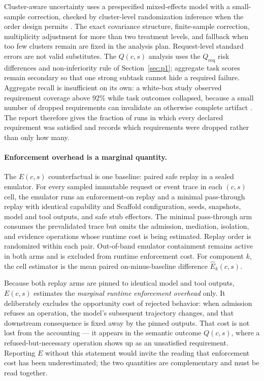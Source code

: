 Cluster-aware uncertainty uses a prespecified mixed-effects model with a small-sample correction, checked by cluster-level randomization inference when the order design permits \cite{turner2007cluster}. The exact covariance structure, finite-sample correction, multiplicity adjustment for more than two treatment levels, and fallback when too few clusters remain are fixed in the analysis plan. Request-level standard errors are not valid substitutes. The $Q(c,s)$ analysis uses the $Q_{\mathrm{req}}$ risk differences and non-inferiority rule of Section~\ref{sec:p1}; aggregate task scores remain secondary so that one strong subtask cannot hide a required failure. Aggregate recall is insufficient on its own: a white-box study observed requirement coverage above 92\% while task outcomes collapsed, because a small number of dropped requirements can invalidate an otherwise complete artifact \cite{xue2026longcontext}. The report therefore gives the fraction of runs in which every declared requirement was satisfied and records which requirements were dropped rather than only how many.

\paragraph{Enforcement overhead is a marginal quantity.}
The $E(c,s)$ counterfactual is one baseline: paired safe replay in a sealed emulator. For every sampled immutable request or event trace in each $(c,s)$ cell, the emulator runs an enforcement-on replay and a minimal pass-through replay with identical capability and Scaffold configuration, seeds, snapshots, model and tool outputs, and safe stub effectors. The minimal pass-through arm consumes the prevalidated trace but omits the admission, mediation, isolation, and evidence operations whose runtime cost is being estimated. Replay order is randomized within each pair. Out-of-band emulator containment remains active in both arms and is excluded from runtime enforcement cost. For component $k$, the cell estimator is the mean paired on-minus-baseline difference $\widehat{E}_k(c,s)$.

Because both replay arms are pinned to identical model and tool outputs, $E(c,s)$ estimates the \textit{marginal runtime enforcement overhead} only. It deliberately excludes the opportunity cost of rejected behavior: when admission refuses an operation, the model's subsequent trajectory changes, and that downstream consequence is fixed away by the pinned outputs. That cost is not lost from the accounting --- it appears in the semantic outcome $Q(c,s)$, where a refused-but-necessary operation shows up as an unsatisfied requirement. Reporting $E$ without this statement would invite the reading that enforcement cost has been underestimated; the two quantities are complementary and must be read together.

